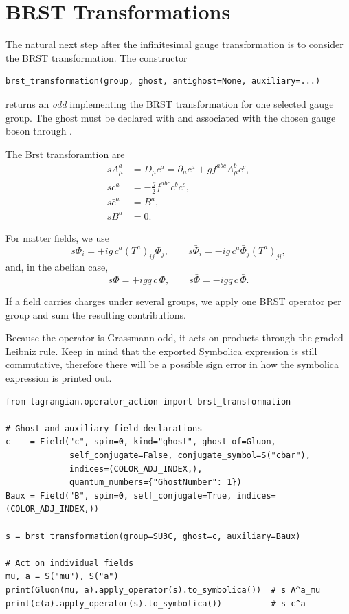 \section{BRST Transformations}
\label{sec:feynpy-brst}

The natural next step after the infinitesimal gauge transformation is to consider the BRST transformation. The constructor

\begin{verbatim}
brst_transformation(group, ghost, antighost=None, auxiliary=...)
\end{verbatim}

\noindent returns an \emph{odd}  implementing the BRST
transformation for one selected gauge group. The ghost must be declared with
 and associated with the chosen gauge boson through
.



\noindent The Brst transforamtion are 
\begin{align*}
    s A_\mu^a &= D_\mu c^a = \partial_\mu c^a + g f^{abc} A_\mu^b c^c,\\
    s c^a &= -\frac{g}{2} f^{abc} c^b c^c,\\
    s \bar c^a &= B^a,\\
    s B^a &= 0.
\end{align*}

\noindent For matter fields, we use
$$
s \Phi_i = + i g\, c^a (T^a)_{ij} \Phi_j,
\qquad
s \bar\Phi_i = - i g\, c^a \bar\Phi_j (T^a)_{ji},
$$
and, in the abelian case,
$$
s \Phi = + i g q\, c\, \Phi,
\qquad
s \bar\Phi = - i g q\, c\, \bar\Phi.
$$

If a field carries charges under several groups, we apply one BRST operator per group and sum the resulting contributions.

Because the operator is Grassmann-odd, it acts on products through the graded Leibniz rule.
Keep in mind that the exported Symbolica expression is still commutative, therefore there will be a possible sign error in how the symbolica expression is printed out.
\begin{verbatim}
from lagrangian.operator_action import brst_transformation

# Ghost and auxiliary field declarations
c    = Field("c", spin=0, kind="ghost", ghost_of=Gluon,
             self_conjugate=False, conjugate_symbol=S("cbar"),
             indices=(COLOR_ADJ_INDEX,),
             quantum_numbers={"GhostNumber": 1})
Baux = Field("B", spin=0, self_conjugate=True, indices=(COLOR_ADJ_INDEX,))

s = brst_transformation(group=SU3C, ghost=c, auxiliary=Baux)

# Act on individual fields
mu, a = S("mu"), S("a")
print(Gluon(mu, a).apply_operator(s).to_symbolica())  # s A^a_mu
print(c(a).apply_operator(s).to_symbolica())          # s c^a
\end{verbatim}


